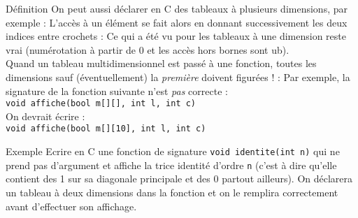 \documentclass[10pt]{beamer}
\begin{document}
\begin{frame}[fragile]{\Ctitle}{\stitle}
	\begin{block}{Définition}
		On peut aussi déclarer en C des tableaux à plusieurs dimensions, par exemple :
		L'accès à un élément se fait alors en donnant successivement les deux indices entre crochets :
		Ce qui a été vu pour les tableaux à une dimension reste vrai (numérotation à partir de 0 et les accès hors bornes sont {\sc ub}).\\ \medskip
		\textcolor{BrickRed}{\small \danger } Quand un tableau multidimensionnel est passé à une fonction, toutes les dimensions sauf (éventuellement) la \textit{première} doivent figurées ! :
		Par exemple, la signature de la fonction suivante n'est \textit{pas} correcte : \\
		\texttt{void affiche(bool m[][], int l, int c)} \\
		On devrait écrire : \\
		\texttt{void affiche(bool m[][10], int l, int c)}
	\end{block}
\end{frame}

\begin{frame}[fragile]{\Ctitle}{\stitle}
	\begin{exampleblock}{Exemple}
		Ecrire en C une fonction de signature \texttt{void identite(int n)} qui ne prend pas d'argument et affiche la trice identité d'ordre {\tt n} (c'est à dire qu'elle contient des 1 sur sa diagonale principale et des 0 partout ailleurs). On déclarera un tableau à deux dimensions dans la fonction et on le remplira correctement avant d'effectuer son affichage.
	\end{exampleblock}
\end{frame}
\end{document}
